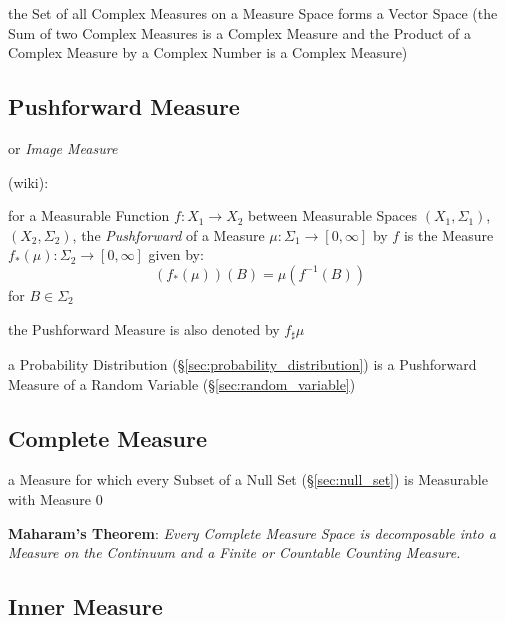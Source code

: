 the Set of all Complex Measures on a Measure Space forms a Vector Space (the Sum
of two Complex Measures is a Complex Measure and the Product of a Complex
Measure by a Complex Number is a Complex Measure)



\subsection{Pushforward Measure}\label{sec:pushforward_measure}

or \emph{Image Measure}

(wiki):

for a Measurable Function $f : X_1 \rightarrow X_2$ between Measurable Spaces
$(X_1, \Sigma_1)$, $(X_2, \Sigma_2)$, the \emph{Pushforward} of a Measure
$\mu : \Sigma_1 \rightarrow [0, \infty]$ by $f$ is the Measure
$f_*(\mu) : \Sigma_2 \rightarrow [0, \infty]$ given by:
\[
  (f_*(\mu))(B) = \mu(f^{-1}(B))
\]
for $B \in \Sigma_2$

the Pushforward Measure is also denoted by $f_\sharp\mu$

\fist a Probability Distribution (\S\ref{sec:probability_distribution}) is a
Pushforward Measure of a Random Variable (\S\ref{sec:random_variable})



\subsection{Complete Measure}\label{sec:complete_measure}

a Measure for which every Subset of a Null Set (\S\ref{sec:null_set}) is
Measurable with Measure $0$

\textbf{Maharam's Theorem}: \emph{
  Every Complete Measure Space is decomposable into a Measure on the Continuum
  and a Finite or Countable Counting Measure.
}



\subsection{Inner Measure}\label{sec:inner_measure}

